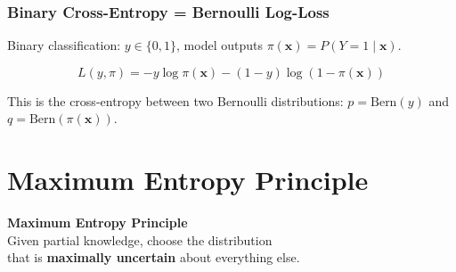 \documentclass[aspectratio=169]{beamer}
\begin{document}
\begin{frame}
\frametitle{Binary Cross-Entropy = Bernoulli Log-Loss}

\small
Binary classification: $y \in \{0, 1\}$, model outputs $\pi(\mathbf{x}) = P(Y{=}1 \mid \mathbf{x})$.

$$L(y, \pi) = -y\log\pi(\mathbf{x}) - (1-y)\log(1 - \pi(\mathbf{x}))$$

This is the cross-entropy between two Bernoulli distributions:
$p = \text{Bern}(y)$ and $q = \text{Bern}(\pi(\mathbf{x}))$.

\vspace{0.3cm}
\begin{center}
\end{center}
\end{frame}

\section{Maximum Entropy Principle}

\begin{frame}
\begin{center}
\vspace{1cm}
{\LARGE\bfseries\textcolor{popblue}{Maximum Entropy Principle}}\\[15pt]
{\large Given partial knowledge, choose the distribution}\\[4pt]
{\large that is \textbf{maximally uncertain} about everything else.}
\end{center}
\end{frame}
\end{document}
